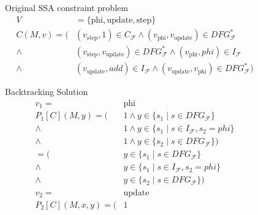 \begin{figure}[p]
    \begin{blackwhitebox}{Original SSA constraint problem}
        \setlength{\abovedisplayskip}{0pt}
        \setlength{\belowdisplayskip}{0pt}
        \vspace{-0.5em}
        \begin{align*}
            V&{}=\{\text{phi}, \text{update}, \text{step}\}\\
            C(M,v)=         ({}&(v_\text{step},1)
                                 \in C_\mathcal{F}
                \mathrel\land   (v_\text{phi},v_\text{update})
                                 \in DFG_\mathcal{F}^*\\
                \mathrel\land{}&(v_\text{step},v_\text{update})
                                 \in DFG_\mathcal{F}^*
                \mathrel\land   (v_\text{phi}, phi)
                                 \in I_\mathcal{F}\\
                \mathrel\land{}&(v_\text{update}, add)
                                 \in I_\mathcal{F}
                \mathrel\land   (v_\text{update},v_\text{phi})
                                 \in DFG_\mathcal{F}^*)
        \end{align*}
    \end{blackwhitebox}
    \begin{blackwhitebox}{Backtracking Solution}
        \setlength{\abovedisplayskip}{0pt}
        \setlength{\belowdisplayskip}{0pt}
        \vspace{-0.5em}
        \begin{align*}
            v_1={}&\text{phi}\\
            P_1[C](M,y)=      (&1
                \mathrel\land   y\in\{s_1\mid s\in DFG_\mathcal{F}\}\\
                \mathrel\land{}&1
                \mathrel\land   y\in\{s_1\mid s\in I_\mathcal{F}, s_2=phi\}\\
                \mathrel\land{}&1
                \mathrel\land   y\in\{s_2\mid s\in DFG_\mathcal{F}\})\\[1em]
                       =      (&y\in\{s_1\mid s\in DFG_\mathcal{F}\}\\
                \mathrel\land{}&y\in\{s_1\mid s\in I_\mathcal{F}, s_2=phi\}\\
                \mathrel\land{}&y\in\{s_2\mid s\in DFG_\mathcal{F}\})\\[1em]
            v_2={}&\text{update}\\
            P_2[C](M,x,y)=    (&1

\end{align*}
\end{blackwhitebox}
\end{figure}
